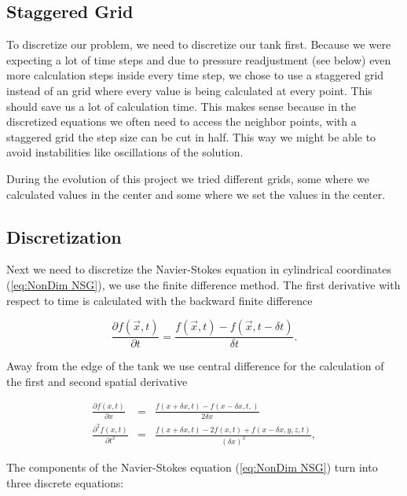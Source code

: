 \documentclass[12pt, a4paper, twoside]{article}
\begin{document}
	\subsection{Staggered Grid}
		To discretize our problem, we need to discretize our tank first. Because we were expecting a lot of time steps and due to pressure readjustment (see below) even more calculation steps inside every time step, we chose to use a staggered grid instead of an grid where every value is being calculated at every point. This should save us a lot of calculation time. This makes sense because in the discretized equations we often need to access the neighbor points, with a staggered grid the step size can be cut in half. This way we might be able to avoid instabilities like oscillations of the solution. 
		
		During the evolution of this project we tried different grids, some where we calculated values in the center and some where we set the values in the center. %
		
		
	\subsection{Discretization}
		Next we need to discretize the Navier-Stokes equation in cylindrical coordinates (\ref{eq:NonDim NSG}), we use the finite difference method. The first derivative with respect to time is calculated with the backward finite difference
		
		\begin{equation}
			\frac{\partial f(\vec{x}, t)}{\partial t} = \frac{f(\vec{x},t) - f(\vec{x}, t - \delta t)}{\delta t} .
			\label{eq:BackDiv Time}
		\end{equation}
		
		Away from the edge of the tank we use central difference for the calculation of the first and second spatial derivative %
		
		\begin{eqnarray}
			\frac{\partial f(x,t)}{\partial x} &=& \frac{f(x + \delta x,t) - f(x - \delta x,t,)}{2\delta x}
			\label{eq:CentrDiv Space}
			\\
			\frac{\partial^2 f(x,t)}{\partial t^2} &=& \frac{f(x+\delta x,t) - 2f(x,t) + f(x - \delta x,y,z,t)}{\left(\delta x\right)^2} ,
			\label{eq:2CentrDiv Space}
		\end{eqnarray}
		
		The components of the Navier-Stokes equation (\ref{eq:NonDim NSG}) turn into three discrete equations:
		
\end{document}
